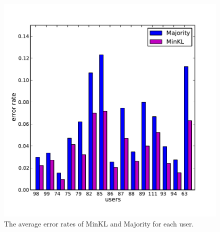 \documentclass{article}
\begin{document}
\begin{figure}[htb]
\vskip 0.2in
\begin{center}
\centering
  \includegraphics[width=.95\linewidth]{figures/icml-uright-allusers.pdf}
  \caption{The average error rates of MinKL and Majority for each user.}
  \label{fig:uright-results}
\end{center}
\vskip -0.2in
\end{figure}
\end{document}
